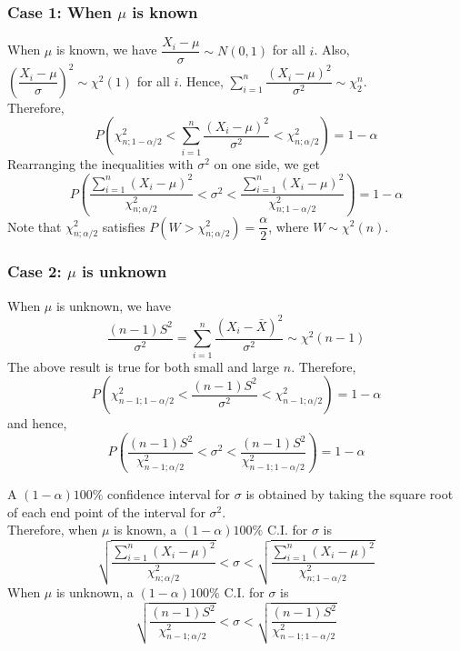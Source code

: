 \subsubsection{Case 1: When $\mu$ is known}
When $\mu$ is known, we have $\dfrac{X_i - \mu}{\sigma} \sim N(0,1)$ for all $i$. Also, $\left(\dfrac{X_i - \mu }{\sigma}\right)^2 \sim \chi^2(1)$ for all $i$. Hence, $\sum_{i = 1}^n \dfrac{(X_i - \mu )^2}{\sigma^2} \sim \chi_2^n$. \\
Therefore,
$$
P\left( \chi_{n; 1 - \alpha/2}^2 < \sum_{i = 1}^n \dfrac{(X_i - \mu )^2}{\sigma^2} < \chi_{n;\alpha/2}^2
\right) = 1 - \alpha
$$
Rearranging the inequalities with $\sigma^2$ on one side, we get
$$
P\left( \dfrac{\sum_{i = 1}^n (X_i - \mu )^2 }{\chi_{n;\alpha/2}^2} < \sigma^2 < \dfrac{\sum_{i = 1}^n (X_i - \mu )^2 }{\chi_{n; 1 - \alpha/2}^2}
\right) = 1 - \alpha
$$
Note that $\chi_{n;\alpha/2}^2$ satisfies $P(W > \chi_{n;\alpha/2}^2) = \dfrac{\alpha}{2}$, where $W \sim \chi^2(n)$. \\
\subsubsection{Case 2: $\mu$ is unknown}
When $\mu$ is unknown, we have
$$
\dfrac{(n-1)S^2}{\sigma^2} = \sum_{i = 1}^n \dfrac{(X_i - \bar{X})^2}{\sigma^2} \sim \chi^2(n - 1)
$$
The above result is true for both small and large $n$.
Therefore,
$$
P\left(\chi_{n - 1; 1 - \alpha/2}^2 < \dfrac{(n-1)S^2}{\sigma^2} < \chi_{n - 1; \alpha/2}^2 \right) = 1 - \alpha
$$
and hence, 
$$
P\left(\dfrac{(n - 1)S^2}{\chi_{n - 1; \alpha/2}^2} < \sigma^2 < \dfrac{(n - 1)S^2}{\chi_{n - 1; 1 - \alpha/2}^2} \right) = 1 - \alpha
$$

\begin{note}
\end{note}
A $(1 - \alpha)100\%$ confidence interval for $\sigma$ is obtained by taking the square root of each end point of the interval for $\sigma^2$. \\
Therefore, when $\mu$ is known, a $(1 - \alpha)100\%$ C.I. for $\sigma$ is
$$
\sqrt{\dfrac{\sum_{i = 1}^n (X_i - \mu )^2 }{\chi_{n;\alpha/2}^2}} < \sigma < \sqrt{ \dfrac{\sum_{i = 1}^n (X_i - \mu )^2 }{\chi_{n; 1 - \alpha/2}^2}}
$$
When $\mu$ is unknown, a $(1 - \alpha)100\%$ C.I. for $\sigma$ is
$$
\sqrt{\dfrac{(n - 1)S^2}{\chi_{n - 1; \alpha/2}^2}} < \sigma < \sqrt{\dfrac{(n - 1)S^2}{\chi_{n - 1; 1 - \alpha/2}^2}}
$$
